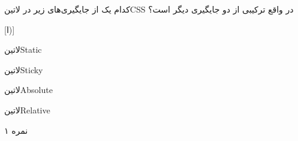 
کدام یک از جایگیری‌های زیر در ‌لاتین{CSS} در واقع ترکیبی از دو جایگیری دیگر است؟

[ا)]

 ‌لاتین{Static}

 ‌لاتین{Sticky}

 ‌لاتین{Absolute}

 ‌لاتین{Relative}



۱ نمره
